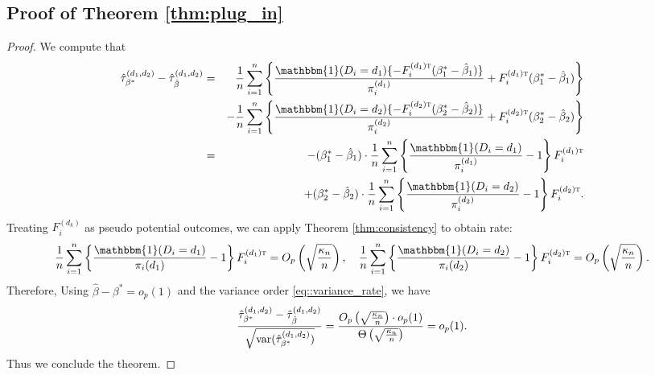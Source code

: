 \documentclass{article}
\theoremstyle{plain}
\theoremstyle{definition}
\theoremstyle{remark}
\def\T{{\textsc{t}}}
\newcommand{\var}{\textup{var}}
\newcommand{\indicator}{\mathbbm{1}}
\newcommand{\sumi}{\sum_{i=1}^n}
\begin{document}
\subsection{Proof of Theorem \ref{thm:plug_in}}
\begin{proof}
    We compute that
    \begin{eqnarray*}
        \hat\tau^{(d_1, d_2)}_{\beta^*} - \hat\tau^{(d_1, d_2)}_{\hat\beta} &=& \frac{1}{n}\sumi \left\{ \frac{\indicator(D_i=d_1)\{-F_i^{(d_1)\T} (\beta_1^* - \hat\beta_1)\}}{\pi_i^{(d_1)}} + F_i^{(d_1)\T}(\beta_1^* - \hat\beta_1) \right\} \\
        &&- \frac{1}{n}\sumi \left\{ \frac{\indicator(D_i=d_2)\{-F_i^{(d_2)\T} (\beta_2^* - \hat\beta_2)\}}{\pi_i^{(d_2)}} + F_i^{(d_2)\T}(\beta_2^* - \hat\beta_2) \right\} \\
        &=& -(\beta_1^* - \hat\beta_1)\cdot \frac{1}{n}\sumi  \left\{\frac{\indicator(D_i=d_1)}{\pi_i^{(d_1)}} - 1\right\}F_i^{(d_1)\T} \\
        &&+ (\beta_2^* - \hat\beta_2)\cdot \frac{1}{n}\sumi \left\{\frac{\indicator(D_i=d_2)}{\pi_i^{(d_2)}} - 1\right\}F_i^{(d_2)\T}.
    \end{eqnarray*}
    Treating $F_i^{(d_k)}$ as pseudo potential outcomes, we can apply Theorem \ref{thm:consistency} to obtain rate:
    \begin{eqnarray*}
        \frac{1}{n}\sumi  \left\{\frac{\indicator(D_i=d_1)}{\pi_i(d_1)} - 1\right\}F_i^{(d_1)\T} = O_p\left(\sqrt{\frac{\kappa_n}{n}}\right), \quad \frac{1}{n}\sumi \left\{\frac{\indicator(D_i=d_2)}{\pi_i(d_2)} - 1\right\}F_i^{(d_2)\T} = O_p\left(\sqrt{\frac{\kappa_n}{n}}\right).
    \end{eqnarray*}
    Therefore,  Using $\hat\beta - \beta^* = o_p(1)$ and the variance order \eqref{eq::variance_rate}, we have
    \begin{eqnarray*}
        \frac{\hat\tau^{(d_1, d_2)}_{\beta^*} - \hat\tau^{(d_1, d_2)}_{\hat\beta}}{\sqrt{\var(\hat\tau^{(d_1, d_2)}_{\beta^*})}} = \frac{O_p\left(\sqrt{\frac{\kappa_n}{n}}\right) \cdot o_p(1)}{\Theta\left(\sqrt{\frac{\kappa_n}{n}}\right)}  = o_p(1).
    \end{eqnarray*}
    Thus we conclude the theorem.
\end{proof}
\end{document}
